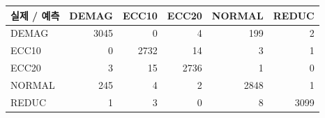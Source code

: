 \begin{tabular}{lrrrrr}
\toprule
실제 / 예측 & DEMAG & ECC10 & ECC20 & NORMAL & REDUC \\
\midrule
DEMAG & 3045 & 0 & 4 & 199 & 2 \\
ECC10 & 0 & 2732 & 14 & 3 & 1 \\
ECC20 & 3 & 15 & 2736 & 1 & 0 \\
NORMAL & 245 & 4 & 2 & 2848 & 1 \\
REDUC & 1 & 3 & 0 & 8 & 3099 \\
\bottomrule
\end{tabular}
